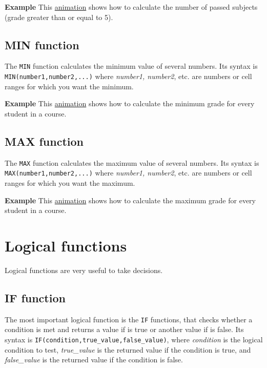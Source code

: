 \textbf{Example} This \href{http://aprendeconalf.es/office/excel/manual/img/example_function_countif.gif}{animation} shows how to calculate the number of passed subjects (grade greater than or equal to 5).

\subsection{MIN function}\hypertarget{min-function}{}\label{min-function}

The \texttt{MIN} function calculates the minimum value of several numbers. Its syntax is
\texttt{MIN(number1,number2,...)} where \emph{number1, number2}, etc. are numbers or cell ranges for which you want the
minimum.

\textbf{Example} This \href{http://aprendeconalf.es/office/excel/manual/img/example_function_min.gif}{animation} shows how to calculate the minimum grade for every student in a course.

\subsection{MAX function}\hypertarget{max-function}{}\label{max-function}

The \texttt{MAX} function calculates the maximum value of several numbers. Its syntax is
\texttt{MAX(number1,number2,...)} where \emph{number1, number2}, etc. are numbers or cell ranges for which you want the
maximum.

\textbf{Example} This \href{http://aprendeconalf.es/office/excel/manual/img/example_function_max.gif}{animation} shows how to calculate the maximum grade for every student in a course.

\section{Logical functions}\hypertarget{logical-functions}{}\label{logical-functions}

Logical functions are very useful to take decisions.

\subsection{IF function}\hypertarget{if-function}{}\label{if-function}

The most important logical function is the \texttt{IF} functions, that checks whether a condition is met and returns a
value if is true or another value if is false. Its syntax is \texttt{IF(condition,true\_value,false\_value)}, where
\emph{condition} is the logical condition to test, \emph{true\_value} is the returned value if the condition is true,
and \emph{false\_value} is the returned value if the condition is false.

